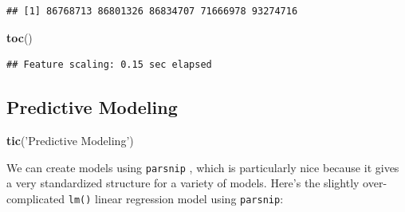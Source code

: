 \documentclass[
]{book}
\newenvironment{Shaded}{\begin{snugshade}}{\end{snugshade}}
\newcommand{\DecValTok}[1]{\textcolor[rgb]{0.00,0.00,0.81}{#1}}
\newcommand{\KeywordTok}[1]{\textcolor[rgb]{0.13,0.29,0.53}{\textbf{#1}}}
\newcommand{\NormalTok}[1]{#1}
\newcommand{\OperatorTok}[1]{\textcolor[rgb]{0.81,0.36,0.00}{\textbf{#1}}}
\newcommand{\StringTok}[1]{\textcolor[rgb]{0.31,0.60,0.02}{#1}}
\begin{document}
\begin{Shaded}
\end{Shaded}

\begin{verbatim}
## [1] 86768713 86801326 86834707 71666978 93274716
\end{verbatim}

\begin{Shaded}
\begin{Highlighting}[]
\KeywordTok{toc}\NormalTok{()}
\end{Highlighting}
\end{Shaded}

\begin{verbatim}
## Feature scaling: 0.15 sec elapsed
\end{verbatim}

\hypertarget{predictive-modeling}{%
\subsection{Predictive Modeling}\label{predictive-modeling}}

\begin{Shaded}
\begin{Highlighting}[]
\KeywordTok{tic}\NormalTok{(}\StringTok{'Predictive Modeling'}\NormalTok{)}
\end{Highlighting}
\end{Shaded}

We can create models using \texttt{parsnip} \citep{R-parsnip}, which is particularly nice because it gives a very standardized structure for a variety of models. Here's the slightly over-complicated \texttt{lm()} linear regression model using \texttt{parsnip}:

\begin{Shaded}
\end{Shaded}
\end{document}
